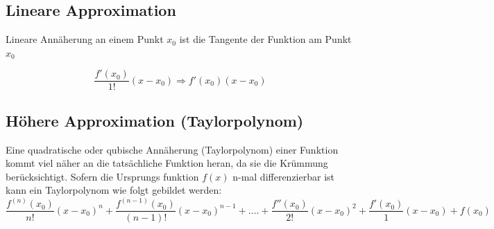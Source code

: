 \documentclass[12pt]{scrartcl}
\begin{document}
\subsection{Lineare Approximation}

Lineare Annäherung an einem Punkt $x_0$ ist die Tangente der 
Funktion am Punkt $x_0$

\[ \frac{f'( x_0 )}{1!} ( x - x_0) \Rightarrow f'( x_0 ) ( x - x_0) \] 


\subsection{Höhere Approximation (Taylorpolynom)}

Eine quadratische oder qubische Annäherung (Taylorpolynom) einer Funktion kommt viel näher an die tatsächliche Funktion heran, 
da sie die Krümmung berücksichtigt. Sofern die Ursprungs funktion $f(x)$ n-mal
differenzierbar ist kann ein Taylorpolynom wie folgt gebildet werden:
\[
    \frac{f^{(n)} ( x_0 )}{n!} ( x - x_0)^n +
    \frac{f^{(n-1)} ( x_0 )}{(n - 1)!} ( x - x_0)^{n - 1} + .... +
    \frac{f'' ( x_0 )}{2!} ( x - x_0)^2 + 
    \frac{f' ( x_0 )}{1} ( x - x_0)
    + f(x_0)
\]


\newcommand{\drawmisding}{
    \begin{tikzpicture}[line cap=round,line join=round,>=triangle 45,x=1cm,y=1cm]
        \clip(-2,-3) rectangle (2,3);
        \draw[line width=2pt,smooth,samples=200,domain=0.14:2.5] plot(\x,{ln((\x))});
        \begin{scriptsize}
            \draw[color=black] (0,-4) node {$f$};
        \end{scriptsize}
    \end{tikzpicture}
}
\end{document}
